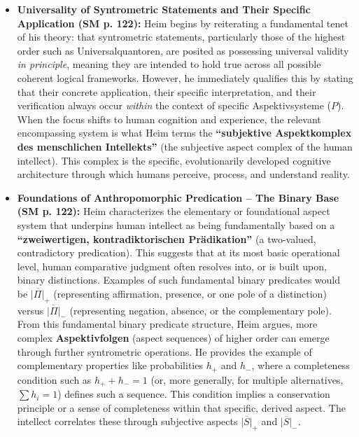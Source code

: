 \documentclass[12pt]{article}
\newcommand{\q}[1]{\enquote{#1}}
\newcommand{\aspektivsystem}{P}
\begin{document}
\begin{itemize}
    \item \textbf{Universality of Syntrometric Statements and Their Specific Application (SM p. 122):}
    Heim begins by reiterating a fundamental tenet of his theory: that syntrometric statements, particularly those of the highest order such as Universalquantoren, are posited as possessing universal validity \textit{in principle}, meaning they are intended to hold true across all possible coherent logical frameworks. However, he immediately qualifies this by stating that their concrete application, their specific interpretation, and their verification always occur \textit{within} the context of specific Aspektivsysteme (\(\aspektivsystem\)). When the focus shifts to human cognition and experience, the relevant encompassing system is what Heim terms the \textbf{\q{subjektive Aspektkomplex des menschlichen Intellekts}} (the subjective aspect complex of the human intellect). This complex is the specific, evolutionarily developed cognitive architecture through which humans perceive, process, and understand reality.

    \item \textbf{Foundations of Anthropomorphic Predication – The Binary Base (SM p. 122):}
    Heim characterizes the elementary or foundational aspect system that underpins human intellect as being fundamentally based on a \textbf{\q{zweiwertigen, kontradiktorischen Prädikation}} (a two-valued, contradictory predication). This suggests that at its most basic operational level, human comparative judgment often resolves into, or is built upon, binary distinctions. Examples of such fundamental binary predicates would be \( \overline{|\Pi|}_+ \) (representing affirmation, presence, or one pole of a distinction) versus \( \overline{|\Pi|}_- \) (representing negation, absence, or the complementary pole). From this fundamental binary predicate structure, Heim argues, more complex \textbf{Aspektivfolgen} (aspect sequences) of higher order can emerge through further syntrometric operations. He provides the example of complementary properties like probabilities \( h_+ \) and \( h_- \), where a completeness condition such as \( h_+ + h_- = 1 \) (or, more generally, for multiple alternatives, \( \sum h_i = 1 \)) defines such a sequence. This condition implies a conservation principle or a sense of completeness within that specific, derived aspect. The intellect correlates these through subjective aspects \( \overline{|S|}_+ \) and \( \overline{|S|}_- \).


\end{itemize}
\end{document}
